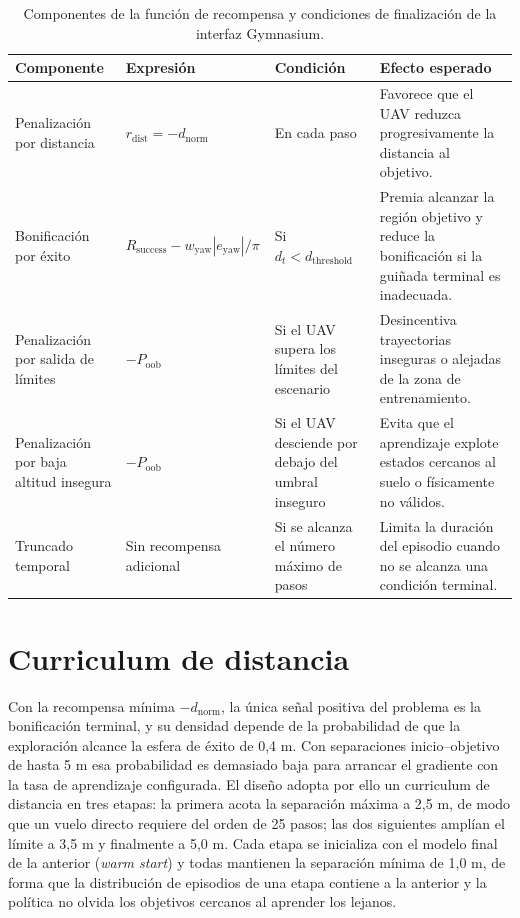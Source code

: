 \begin{table}[t]
\centering
\small
\setlength{\tabcolsep}{4pt}
\renewcommand{\arraystretch}{1.15}
\begin{tabular}{p{} p{} p{} p{}}
\hline
\textbf{Componente} & \textbf{Expresión} & \textbf{Condición} & \textbf{Efecto esperado} \\
\hline

Penalización por distancia &
$r_{\mathrm{dist}} = -d_{\mathrm{norm}}$ &
En cada paso &
Favorece que el UAV reduzca progresivamente la distancia al objetivo. \\

Bonificación por éxito &
$R_{\mathrm{success}} - w_{\mathrm{yaw}} |e_{\mathrm{yaw}}|/\pi$ &
Si $d_t < d_{\mathrm{threshold}}$ &
Premia alcanzar la región objetivo y reduce la bonificación si la guiñada terminal es inadecuada. \\

Penalización por salida de límites &
$-P_{\mathrm{oob}}$ &
Si el UAV supera los límites del escenario &
Desincentiva trayectorias inseguras o alejadas de la zona de entrenamiento. \\

Penalización por baja altitud insegura &
$-P_{\mathrm{oob}}$ &
Si el UAV desciende por debajo del umbral inseguro &
Evita que el aprendizaje explote estados cercanos al suelo o físicamente no válidos. \\

Truncado temporal &
Sin recompensa adicional &
Si se alcanza el número máximo de pasos &
Limita la duración del episodio cuando no se alcanza una condición terminal. \\

\hline
\end{tabular}
\caption{Componentes de la función de recompensa y condiciones de finalización de la interfaz Gymnasium.}
\label{tab:aplicacion:componentes_recompensa}
\end{table}

\section{Curriculum de distancia} \label{sct:aplicacion:curriculum}

Con la recompensa mínima $-d_{\mathrm{norm}}$, la única señal positiva del
problema es la bonificación terminal, y su densidad depende de la probabilidad de
que la exploración alcance la esfera de éxito de 0,4 m. Con separaciones
inicio--objetivo de hasta 5 m esa probabilidad es demasiado baja para arrancar el
gradiente con la tasa de aprendizaje configurada. El diseño adopta por ello un
curriculum de distancia \cite{bengio2009curriculum} en tres etapas: la primera acota la separación máxima a
2,5 m, de modo que un vuelo directo requiere del orden de 25 pasos; las dos
siguientes amplían el límite a 3,5 m y finalmente a 5,0 m. Cada
etapa se inicializa con el modelo final de la anterior (\emph{warm start}) y
todas mantienen la separación mínima de 1,0 m, de forma que la distribución de
episodios de una etapa contiene a la anterior y la política no olvida los
objetivos cercanos al aprender los lejanos.

